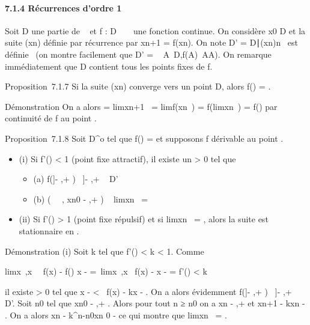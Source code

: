 \paragraph{7.1.4 Récurrences d'ordre 1}

Soit D une partie de ~ et f : D \rightarrow~ ~ une fonction continue. On considère
x0 \in D et la suite (xn) définie par récurrence par
xn+1 = f(xn). On note D' =
 \in
D∣(xn)n\in{}~\text
est définie \ (on montre facilement que D'
= \⋃ ~
A\subset~D,f(A)\subset~AA). On remarque immédiatement que D contient tous les
points fixes de f.

Proposition~7.1.7 Si la suite (xn) converge vers un point \ell \in
D, alors f(\ell) = \ell.

Démonstration On a alors \ell = limxn+1~
= limf(xn~) =
f(limxn~) = f(\ell) par continuité de f
au point \ell.

Proposition~7.1.8 Soit \ell \in D^o tel que f(\ell) = \ell et supposons
f dérivable au point \ell.

\begin{itemize}
\itemsep1pt\parskip0pt
\item
  (i) Si \textbar{}f'(\ell)\textbar{} \textless{} 1 (point fixe attractif),
  il existe un \eta \textgreater{} 0 tel que

  \begin{itemize}
  \itemsep1pt\parskip0pt
  \item
    (a) f({]}\ell - \eta,\ell + \eta{[}) \subset~{]}\ell - \eta,\ell + \eta{[}\subset~ D'
  \item
    (b) \left (~ \in
    ~, xn0 \in{]}\ell - \eta,\ell + \eta{[}\right )
    \rigtharrow~ limxn~ = \ell
  \end{itemize}
\item
  (ii) Si \textbar{}f'(\ell)\textbar{} \textgreater{} 1 (point fixe
  répulsif) et si limxn~ = \ell, alors
  la suite est stationnaire en \ell.
\end{itemize}

Démonstration (i) Soit k tel que \textbar{}f'(\ell)\textbar{} \textless{} k
\textless{} 1. Comme

limx\rightarrow~\ell,x\neq~\ell~\left
\textbar{} f(x) - f(\ell) \over x - \ell
\right \textbar{} =\
limx\rightarrow~\ell,x\neq~\ell\left
\textbar{} f(x) - \ell \over x - \ell \right
\textbar{} = \textbar{}f'(\ell)\textbar{} \textless{} k

il existe \eta \textgreater{} 0 tel que \textbar{}x - \ell\textbar{}
\textless{} \eta \rigtharrow~\textbar{}f(x) - \ell\textbar{}\leq k\textbar{}x - \ell\textbar{}.
On a alors évidemment f({]}\ell - \eta,\ell + \eta{[}) \subset~{]}\ell - \eta,\ell + \eta{[}\subset~ D'. Soit
n0 tel que xn0 \in{]}\ell - \eta,\ell + \eta{[}. Alors
pour tout n ≥ n0 on a xn \in{]}\ell - \eta,\ell + \eta{[} et
\textbar{}xn+1 - \ell\textbar{}\leq k\textbar{}xn -
\ell\textbar{}. On a alors \textbar{}xn - \ell\textbar{}\leq
k^n-n0\textbar{}xn 0 -
\ell\textbar{} ce qui montre que limxn~
= \ell.

